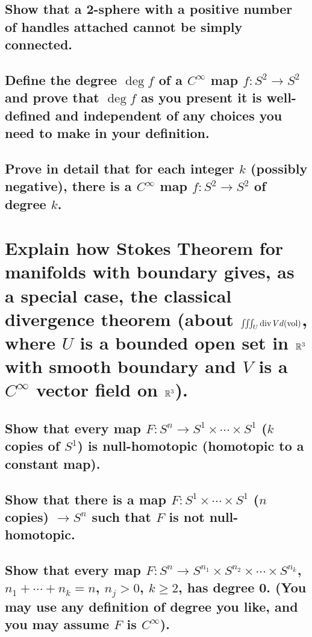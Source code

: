 \documentclass[10pt]{article}
\begin{document}
\subsection{Show that a 2-sphere with a positive number of handles attached cannot be simply
  connected.}

\advsection{}

\subsection{Define the degree $\deg f$ of a $C^\infty$ map $f: S^2 \to S^2$ and prove that $\deg f$
  as you present it is well-defined and independent of any choices you need to make in your
  definition.}

\subsection{Prove in detail that for each integer $k$ (possibly negative), there is a $C^\infty$ map
  $f: S^2 \to S^2$ of degree $k$.}

\section{Explain how Stokes Theorem for manifolds with boundary gives, as a special case, the
  classical divergence theorem (about $\iiint_U \operatorname{div} V d(\operatorname{vol} )$, where $U$ is a bounded open set in
  $\mathbb{R}^3$ with smooth boundary and $V$ is a $C^\infty$ vector field on $\mathbb{R}^3$).}

\advsection{}

\subsection{Show that every map $F: S^n \to S^1 \times \cdots \times S^1$ ($k$ copies of $S^1$) is
  null-homotopic (homotopic to a constant map).}

\subsection{Show that there is a map $F: S^1 \times \cdots \times S^1$ ($n$ copies) $ \to S^n$ such
  that $F$ is not null-homotopic.}

\subsection{Show that every map $F: S^n \to S^{n_1} \times S^{n_2} \times \cdots \times S^{n_k}$,
  $n_1 + \cdots + n_k = n$, $n_j > 0$, $k\geq 2$, has degree 0. (You may use any definition of
  degree you like, and you may assume $F$ is $C^\infty$).}
\end{document}
